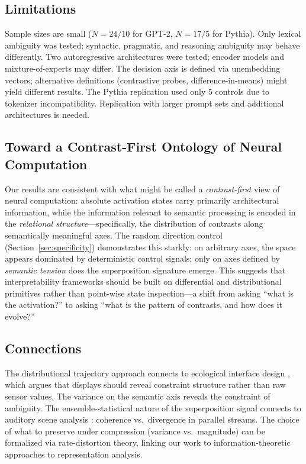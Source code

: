 \documentclass[11pt,a4paper]{article}
\begin{document}
\subsection{Limitations}
Sample sizes are small ($N = 24/10$ for GPT-2, $N = 17/5$ for Pythia). Only lexical ambiguity was tested; syntactic, pragmatic, and reasoning ambiguity may behave differently. Two autoregressive architectures were tested; encoder models and mixture-of-experts may differ. The decision axis is defined via unembedding vectors; alternative definitions (contrastive probes, difference-in-means) might yield different results. The Pythia replication used only 5 controls due to tokenizer incompatibility. Replication with larger prompt sets and additional architectures is needed.

\subsection{Toward a Contrast-First Ontology of Neural Computation}
Our results are consistent with what might be called a \emph{contrast-first} view of neural computation: absolute activation states carry primarily architectural information, while the information relevant to semantic processing is encoded in the \emph{relational structure}---specifically, the distribution of contrasts along semantically meaningful axes. The random direction control (Section~\ref{sec:specificity}) demonstrates this starkly: on arbitrary axes, the space appears dominated by deterministic control signals; only on axes defined by \emph{semantic tension} does the superposition signature emerge. This suggests that interpretability frameworks should be built on differential and distributional primitives rather than point-wise state inspection---a shift from asking ``what is the activation?'' to asking ``what is the pattern of contrasts, and how does it evolve?''

\subsection{Connections}
The distributional trajectory approach connects to ecological interface design \citep{vicente1992ecological}, which argues that displays should reveal constraint structure rather than raw sensor values. The variance on the semantic axis reveals the constraint of ambiguity. The ensemble-statistical nature of the superposition signal connects to auditory scene analysis \citep{bregman1990auditory}: coherence vs.\ divergence in parallel streams. The choice of what to preserve under compression (variance vs.\ magnitude) can be formalized via rate-distortion theory, linking our work to information-theoretic approaches to representation analysis.
\end{document}
